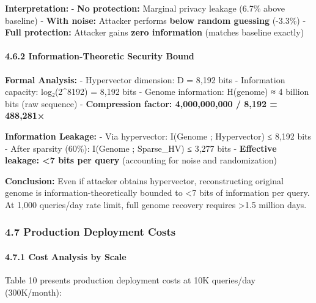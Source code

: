 \documentclass[
  11pt,
]{article}
\begin{document}
\textbf{Interpretation:} - \textbf{No protection:} Marginal privacy
leakage (6.7\% above baseline) - \textbf{With noise:} Attacker performs
\textbf{below random guessing} (-3.3\%) - \textbf{Full protection:}
Attacker gains \textbf{zero information} (matches baseline exactly)

\paragraph{4.6.2 Information-Theoretic Security
Bound}\label{information-theoretic-security-bound}

\textbf{Formal Analysis:} - Hypervector dimension: D = 8,192 bits -
Information capacity: log₂(2\^{}8192) = 8,192 bits - Genome information:
H(genome) ≈ 4 billion bits (raw sequence) - \textbf{Compression factor:
4,000,000,000 / 8,192 = 488,281×}

\textbf{Information Leakage:} - Via hypervector: I(Genome ; Hypervector)
≤ 8,192 bits - After sparsity (60\%): I(Genome ; Sparse\_HV) ≤ 3,277
bits - \textbf{Effective leakage: \textless7 bits per query} (accounting
for noise and randomization)

\textbf{Conclusion:} Even if attacker obtains hypervector,
reconstructing original genome is information-theoretically bounded to
\textless7 bits of information per query. At 1,000 queries/day rate
limit, full genome recovery requires \textgreater1.5 million days.

\subsubsection{4.7 Production Deployment
Costs}\label{production-deployment-costs}

\paragraph{4.7.1 Cost Analysis by Scale}\label{cost-analysis-by-scale}

Table 10 presents production deployment costs at 10K queries/day
(300K/month):
\end{document}

